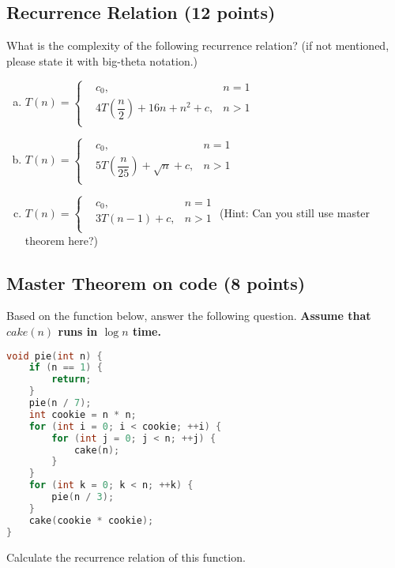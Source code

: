 \documentclass[11pt]{exam}
\begin{document}
\subsection{Recurrence Relation (12 points)}
What is the complexity of the following recurrence relation? (if not mentioned, please state it with big-theta notation.)
\begin{enumerate}[(a)]

\item $T(n) = \left\{
\begin{aligned}
&c_0, &n=1\\
&4T\left(\dfrac{n}{2}\right)+16n+n^2+c, &n>1\\
\end{aligned}
\right.
$

\begin{solution}
\end{solution}

\item $T(n) = \left\{
\begin{aligned}
&c_0, &n=1\\
&5T\left(\dfrac{n}{25}\right)+\sqrt{n}+c, &n>1\\
\end{aligned}
\right.
$

\begin{solution}
\end{solution}

\item $T(n) = \left\{
\begin{aligned}
&c_0, &n=1\\
&3T(n-1)+c, &n>1\\
\end{aligned}
\right.
$ (Hint: Can you still use master theorem here?)
\begin{solution}
\end{solution}
\end{enumerate}

\subsection{Master Theorem on code (8 points)}
Based on the function below, answer the following question. \textbf{Assume that $cake(n)$ runs in $\log n$ time.}
\begin{lstlisting}[language=c++]
void pie(int n) {
	if (n == 1) {
		return;
	}
	pie(n / 7);
	int cookie = n * n;
	for (int i = 0; i < cookie; ++i) {
		for (int j = 0; j < n; ++j) {
			cake(n);
		}
	}
	for (int k = 0; k < n; ++k) {
		pie(n / 3);
	}
	cake(cookie * cookie);
}
\end{lstlisting}
Calculate the recurrence relation of this function.
\begin{solution}
\end{solution}
\newpage
\end{document}
